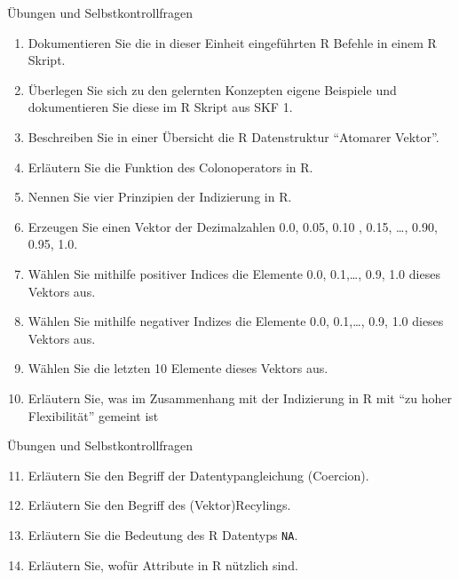 \documentclass[
  8pt,
  ignorenonframetext,
]{beamer}
\providecommand{\tightlist}{%
  \setlength{\itemsep}{0pt}\setlength{\parskip}{0pt}}\usepackage{longtable,booktabs,array}
\begin{document}
\begin{frame}{Übungen und Selbstkontrollfragen}
\protect\hypertarget{uxfcbungen-und-selbstkontrollfragen-1}{}
\vfill
{}
\small

\begin{enumerate}
\tightlist
\item
  Dokumentieren Sie die in dieser Einheit eingeführten R Befehle in
  einem R Skript.\\
\item
  Überlegen Sie sich zu den gelernten Konzepten eigene Beispiele und
  dokumentieren Sie diese im R Skript aus SKF 1.
\item
  Beschreiben Sie in einer Übersicht die R Datenstruktur ``Atomarer
  Vektor''.
\item
  Erläutern Sie die Funktion des Colonoperators in R.
\item
  Nennen Sie vier Prinzipien der Indizierung in R.
\item
  Erzeugen Sie einen Vektor der Dezimalzahlen 0.0, 0.05, 0.10 , 0.15,
  \ldots, 0.90, 0.95, 1.0.
\item
  Wählen Sie mithilfe positiver Indices die Elemente 0.0, 0.1,\ldots,
  0.9, 1.0 dieses Vektors aus.\\
\item
  Wählen Sie mithilfe negativer Indizes die Elemente 0.0, 0.1,\ldots,
  0.9, 1.0 dieses Vektors aus.\\
\item
  Wählen Sie die letzten 10 Elemente dieses Vektors aus.
\item
  Erläutern Sie, was im Zusammenhang mit der Indizierung in R mit ``zu
  hoher Flexibilität'' gemeint ist
\end{enumerate}
\end{frame}

\begin{frame}[fragile]{Übungen und Selbstkontrollfragen}
\protect\hypertarget{uxfcbungen-und-selbstkontrollfragen-2}{}
\vfill
{}
\small

\begin{enumerate}
\setcounter{enumi}{10}
\tightlist
\item
  Erläutern Sie den Begriff der Datentypangleichung (Coercion).
\item
  Erläutern Sie den Begriff des (Vektor)Recylings.
\item
  Erläutern Sie die Bedeutung des R Datentyps \texttt{NA}.
\item
  Erläutern Sie, wofür Attribute in R nützlich sind.
\end{enumerate}

\vfill
\end{frame}
\end{document}
